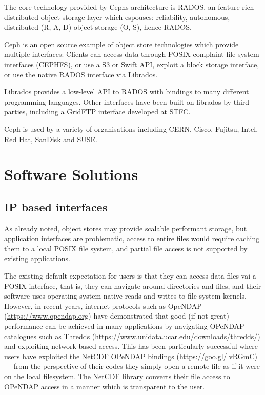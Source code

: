 The core technology provided by Cephs architecture is RADOS, an feature rich distributed object storage layer which espouses: reliability, autonomous, distributed (R, A, D)  object storage (O, S), hence RADOS.

Ceph is an open source example of object store technologies which provide
multiple interfaces: Clients can access data through POSIX complaint file
system interfaces (CEPHFS), or use a S3 or Swift API, exploit a block storage interface, or use the native RADOS interface via Librados.

Librados provides a low-level API to RADOS with bindings to many different programming languages.  Other interfaces have been built on librados by
third parties, including a GridFTP interface developed at STFC.

Ceph is used by a variety of organisations including CERN, Cisco, Fujitsu, Intel, Red Hat, SanDisk and SUSE.

\section{Software Solutions}
\label{sec:sw_solutions}

\subsection{IP based interfaces}

As already noted, object stores may provide scalable performant storage,
but application interfaces are problematic, access to entire files
would require caching them to a local POSIX file system, and partial file
access is not supported by existing applications.

The existing default expectation for users is that they can access data files
vai a POSIX interface, that is, they can navigate around directories and files,
and their software uses operating system native reads and writes to file system
kernels. However, in recent years, internet protocols such as OpeNDAP
(\url{https://www.opendap.org}) have demonstrated that good (if not great)
performance can be achieved in many applications by navigating OPeNDAP
catalogues such as Thredds
(\url{https://www.unidata.ucar.edu/downloads/thredds/}) and exploiting network
based access. This has been particularly successful where users have exploited
the NetCDF OPeNDAP bindings (\url{https://goo.gl/lvRGmC}) --- from the
perspective of their codes they simply open a remote file as if it were on the
local filesystem. The NetCDF library converts their file access to OPeNDAP
access in a manner which is transparent to the user.


